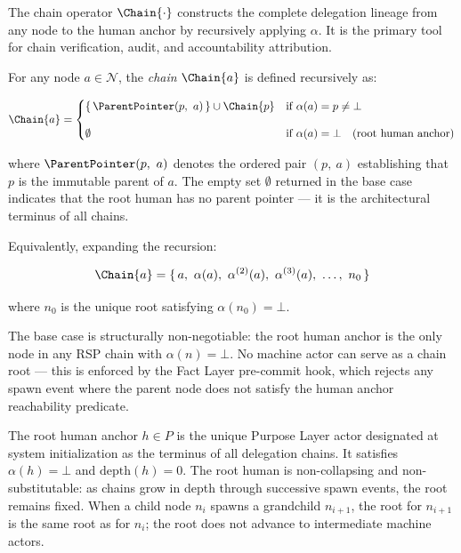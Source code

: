 The chain operator $\Chain{\cdot}$ constructs the complete delegation lineage from any node to the human anchor by recursively applying $\alpha$. It is the primary tool for chain verification, audit, and accountability attribution.

\begin{dfn}
\label{dfn:chain-operator}
For any node $a \in \mathcal{N}$, the \emph{chain} $\Chain{a}$ is defined recursively as:

\begin{equation}
\Chain{a} =
\begin{cases}
\{\, \ParentPointer(p,\ a) \, \} \cup \Chain{p} & \text{if } \alpha(a) = p \neq \bot \\[10pt]
\emptyset & \text{if } \alpha(a) = \bot \quad \text{(root human anchor)}
\end{cases}
\label{eq:chain-operator}
\end{equation}

where $\ParentPointer(p,\ a)$ denotes the ordered pair $(p,\ a)$ establishing that $p$ is the immutable parent of $a$. The empty set $\emptyset$ returned in the base case indicates that the root human has no parent pointer — it is the architectural terminus of all chains.

Equivalently, expanding the recursion:

\begin{equation}
\Chain{a} = \{\, a,\ \alpha(a),\ \alpha^{(2)}(a),\ \alpha^{(3)}(a),\ \ldots,\ n_0 \,\}
\label{eq:chain-expanded}
\end{equation}

where $n_0$ is the unique root satisfying $\alpha(n_0) = \bot$.
\end{dfn}

The base case is structurally non-negotiable: the root human anchor is the only node in any RSP chain with $\alpha(n) = \bot$. No machine actor can serve as a chain root — this is enforced by the Fact Layer pre-commit hook, which rejects any spawn event where the parent node does not satisfy the human anchor reachability predicate.

\begin{dfn}
\label{dfn:root-human}
The root human anchor $h \in P$ is the unique Purpose Layer actor designated at system initialization as the terminus of all delegation chains. It satisfies $\alpha(h) = \bot$ and $\mathrm{depth}(h) = 0$. The root human is non-collapsing and non-substitutable: as chains grow in depth through successive spawn events, the root remains fixed. When a child node $n_i$ spawns a grandchild $n_{i+1}$, the root for $n_{i+1}$ is the same root as for $n_i$; the root does not advance to intermediate machine actors.
\end{dfn}

